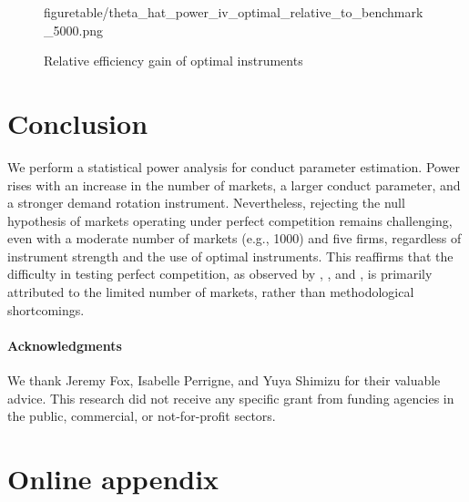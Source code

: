 \documentclass[11pt, a4paper]{article}
\begin{document}
\begin{figure}[!ht]
\begin{center}
{  {figuretable/theta_hat_power_iv_optimal_relative_to_benchmark_5000.png}}
  \caption{Relative efficiency gain of optimal instruments}
  \label{fg:theta_hat_power_iv_optimal_relative_to_benchmark_10000}
  \end{center}
\end{figure} 



\section{Conclusion}

We perform a statistical power analysis for conduct parameter estimation. Power rises with an increase in the number of markets, a larger conduct parameter, and a stronger demand rotation instrument. 
Nevertheless, rejecting the null hypothesis of markets operating under perfect competition remains challenging, even with a moderate number of markets (e.g., 1000) and five firms, regardless of instrument strength and the use of optimal instruments. 
This reaffirms that the difficulty in testing perfect competition, as observed by \cite{genesove1998testing}, \cite{steen1999testing}, and \cite{shaffer1993test}, is primarily attributed to the limited number of markets, rather than methodological shortcomings.

\paragraph{Acknowledgments}
We thank Jeremy Fox, Isabelle Perrigne, and Yuya Shimizu for their valuable advice. This research did not receive any specific grant from funding agencies in the public, commercial, or not-for-profit sectors. 

\newpage





\newpage

\setcounter{page}{1}
\appendix
\section{Online appendix}\label{sec:appendix}
\end{document}
